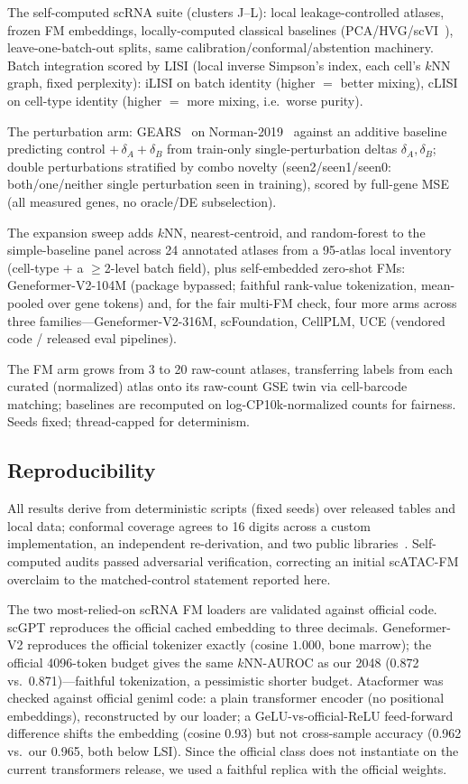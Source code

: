 \documentclass[journal]{IEEEtran}
\begin{document}
The self-computed scRNA suite (clusters J--L): local leakage-controlled atlases, frozen FM embeddings, locally-computed classical baselines (PCA/HVG/scVI~\cite{lopez2018}), leave-one-batch-out splits, same calibration/conformal/abstention machinery. Batch integration scored by LISI (local inverse Simpson's index, each cell's $k$NN graph, fixed perplexity): iLISI on batch identity (higher $=$ better mixing), cLISI on cell-type identity (higher $=$ more mixing, i.e.\ worse purity).

The perturbation arm: GEARS~\cite{roohani2024} on Norman-2019~\cite{norman2019} against an additive baseline predicting control $+\,\delta_A+\delta_B$ from train-only single-perturbation deltas $\delta_A,\delta_B$; double perturbations stratified by combo novelty (seen2/seen1/seen0: both/one/neither single perturbation seen in training), scored by full-gene MSE (all measured genes, no oracle/DE subselection).

The expansion sweep adds $k$NN, nearest-centroid, and random-forest to the simple-baseline panel across 24 annotated atlases from a 95-atlas local inventory (cell-type $+$ a $\geq$2-level batch field), plus self-embedded zero-shot FMs: Geneformer-V2-104M (package bypassed; faithful rank-value tokenization, mean-pooled over gene tokens) and, for the fair multi-FM check, four more arms across three families---Geneformer-V2-316M, scFoundation, CellPLM, UCE (vendored code / released eval pipelines).

The FM arm grows from 3 to 20 raw-count atlases, transferring labels from each curated (normalized) atlas onto its raw-count GSE twin via cell-barcode matching; baselines are recomputed on log-CP10k-normalized counts for fairness. Seeds fixed; thread-capped for determinism.

\subsection{Reproducibility}\label{sec:repro}
All results derive from deterministic scripts (fixed seeds) over released tables and local data; conformal coverage agrees to 16 digits across a custom implementation, an independent re-derivation, and two public libraries~\cite{crepes,mapie}. Self-computed audits passed adversarial verification, correcting an initial scATAC-FM overclaim to the matched-control statement reported here.

The two most-relied-on scRNA FM loaders are validated against official code. scGPT reproduces the official cached embedding to three decimals. Geneformer-V2 reproduces the official tokenizer exactly (cosine $1.000$, bone marrow); the official 4096-token budget gives the same $k$NN-AUROC as our 2048 (0.872 vs.\ 0.871)---faithful tokenization, a pessimistic shorter budget. Atacformer was checked against official geniml code: a plain transformer encoder (no positional embeddings), reconstructed by our loader; a GeLU-vs-official-ReLU feed-forward difference shifts the embedding (cosine 0.93) but not cross-sample accuracy (0.962 vs.\ our 0.965, both below LSI). Since the official class does not instantiate on the current transformers release, we used a faithful replica with the official weights.
\end{document}
